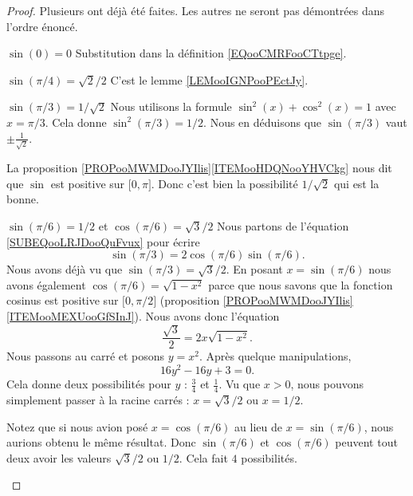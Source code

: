 \begin{proof}
    Plusieurs ont déjà été faites. Les autres ne seront pas démontrées dans l'ordre énoncé.
    \begin{subproof}
        \item[$\sin(0)=0$]
            Substitution dans la définition \eqref{EQooCMRFooCTtpge}.
        \item[$ \sin(\pi/4)=\sqrt{ 2 }/2$] 
            C'est le lemme \ref{LEMooIGNPooPEctJy}.
        \item[$ \sin(\pi/3)=1/\sqrt{ 2 }$] 
            Nous utilisons la formule \( \sin^2(x)+\cos^2(x)=1\) avec \( x=\pi/3\). Cela donne \( \sin^2(\pi/3)=1/2\). Nous en déduisons que \( \sin(\pi/3)\) vaut \( \pm\frac{1}{ \sqrt{ 2 } }\).

            La proposition \ref{PROPooMWMDooJYIlis}\ref{ITEMooHDQNooYHVCkg} nous dit que \( \sin\) est positive sur \(\mathopen[ 0 , \pi \mathclose]\). Donc c'est bien la possibilité \( 1/\sqrt{ 2 }\) qui est la bonne.
        \item[$\sin(\pi/6)=1/2$ et $\cos(\pi/6)=\sqrt{ 3 }/2 $]
            Nous partons de l'équation \eqref{SUBEQooLRJDooQuFvux} pour écrire
            \begin{equation}
                \sin(\pi/3)=2\cos(\pi/6)\sin(\pi/6).
            \end{equation}
            Nous avons déjà vu que \( \sin(\pi/3)=\sqrt{ 3 }/2\). En posant \( x=\sin(\pi/6)\) nous avons également \( \cos(\pi/6)=\sqrt{ 1-x^2 }\) parce que nous savons que la fonction cosinus est positive sur \( \mathopen[ 0 , \pi/2 \mathclose]\) (proposition \ref{PROPooMWMDooJYIlis}\ref{ITEMooMEXUooGfSInJ}). Nous avons donc l'équation
            \begin{equation}
                \frac{ \sqrt{ 3 } }{2}=2x\sqrt{ 1-x^2 }.
            \end{equation}
            Nous passons au carré et posons \( y=x^2\). Après quelque manipulations, 
            \begin{equation}
                16y^2-16y+3=0.
            \end{equation}
            Cela donne deux possibilités pour \( y\) : \( \frac{ 3 }{ 4 }\) et \( \frac{1}{ 4 }\). Vu que \( x>0\), nous pouvons simplement passer à la racine carrés : \( x=\sqrt{ 3 }/2\) ou \( x=1/2\).

            Notez que si nous avion posé \( x=\cos(\pi/6)\) au lieu de \( x=\sin(\pi/6)\), nous aurions obtenu le même résultat. Donc \( \sin(\pi/6)\) et \( \cos(\pi/6)\) peuvent tout deux avoir les valeurs \( \sqrt{ 3 }/2\) ou \( 1/2\). Cela fait \( 4\) possibilités.


\end{subproof}
\end{proof}
